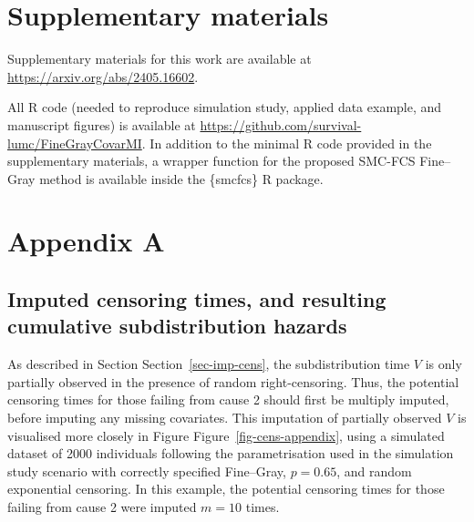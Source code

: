 \documentclass[
  letterpaper,
  paper=240mm:170mm,
  twoside=true,
  open=right,
  fontsize=10pt,
  pagesize=false,
  BCOR=15mm,
  DIV=14,
  headinclude=true,
  footinclude=false,
  headsepline=on]{scrbook}
\begin{document}
\section*{Supplementary materials}\label{supplementary-materials-3}


Supplementary materials for this work are available at
\url{https://arxiv.org/abs/2405.16602}.

All R code (needed to reproduce simulation study, applied data example,
and manuscript figures) is available at
\url{https://github.com/survival-lumc/FineGrayCovarMI}. In addition to
the minimal R code provided in the supplementary materials, a wrapper
function for the proposed SMC-FCS Fine--Gray method is available inside
the \{smcfcs\} R package.

\section*{Appendix A}\label{appendix-a-1}


\subsection*{Imputed censoring times, and resulting cumulative
subdistribution
hazards}\label{imputed-censoring-times-and-resulting-cumulative-subdistribution-hazards}

As described in Section Section~\ref{sec-imp-cens}, the subdistribution
time \(V\) is only partially observed in the presence of random
right-censoring. Thus, the potential censoring times for those failing
from cause 2 should first be multiply imputed, before imputing any
missing covariates. This imputation of partially observed \(V\) is
visualised more closely in Figure Figure~\ref{fig-cens-appendix}, using
a simulated dataset of 2000 individuals following the parametrisation
used in the simulation study scenario with correctly specified
Fine--Gray, \(p = 0.65\), and random exponential censoring. In this
example, the potential censoring times for those failing from cause 2
were imputed \(m = 10\) times.
\end{document}
